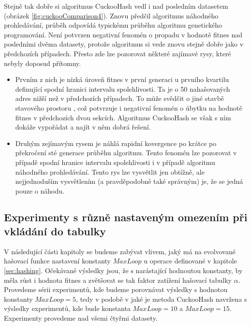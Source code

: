 Stejně tak dobře si algoritmus CuckooHash vedl i nad posledním datasetem (obrázek \ref{fig:cuckooComparison4}). Znovu předčil algoritmus náhodného prohledávání,
průběh odpovídá typickému průběhu algoritmu genetického programování. Není potvrzen negativní fenomén o propadu v hodnotě
fitnes nad posledními dvěma datasety, protože algoritmus si vede znovu stejně dobře jako v předchozích případech. Přesto zde lze
pozorovat některé zajímavé rysy, které nebyly doposud přítomny.
\begin{itemize}
	\item Prvním z nich je nízká úroveň fitnes v první generaci u prvního kvartilu definující spodní hranici intervalu spolehlivosti. Ta je o 50 nahašovaných
		 adres nižší než v předchozích případech. To může svědčit o jiné stavbě stavového prostoru
		, což potvrzuje i negativní fenomén o úbytku na hodnotě fitnes v předchozích dvou sekcích. Algoritmus CuckooHash se však s ním dokáže vypořádat a najít
		v něm dobrá řešení.
	\item Druhým zejímavým rysem je náhlá rapidní kovergence po krátce po překročení sté generace průběhu algoritmu. Tento fenomén lze pozorovat v případě
		spodní hranice intervalu spolehlivosti i v případě algoritmu náhodného prohledávání. Tento rys lze vysvětlit jen obtížně, ale nejjednoduším vysvětlením (a
		pravděpodobně také správným) je, že se jedná pouze o náhodu.
\end{itemize}

\subsection{Experimenty s různě nastaveným omezením při vkládání do tabulky}
V následující části kapitoly se budeme zabývat vlivem, jaký má na evolvované hašovací funkce nastavení konstanty $MaxLoop$ u operace  definované
v kapitole \ref{sec:hashing}. Očekávané výsledky jsou, že s narástající hodnoutou konstanty, by měla růst i hodnota fitnes a zvětšovat se tak faktor zatížení
hašovací tabulky $\alpha$. Provedeme sérii experimentů, kde budeme porovnávat výsledky s hodnotou konstanty $MaxLoop = 5$, tedy v podobě v jaké je metoda
CuckooHash navržena s výsledky experimentů, kde bude konstanta $MaxLoop = 10$ a $MaxLoop = 15$. Experimenty provedeme nad všemi čtyřmi datasety.

